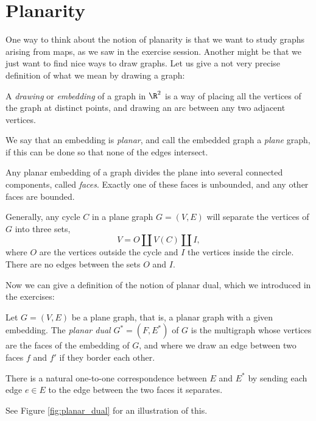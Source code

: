 \documentclass[nobib]{tufte-handout}
\begin{document}
\section{Planarity}

One way to think about the notion of planarity is that we want to study graphs arising from maps, as we saw in the exercise session. Another might be that we just want to find nice ways to draw graphs. Let us give a not very precise definition of what we mean by drawing a graph:

\begin{definition}
  A \emph{drawing} or \emph{embedding} of a graph in $\R^2$ is a way of placing all the vertices of the graph at distinct points, and drawing an arc between any two adjacent vertices.

  We say that an embedding is \emph{planar}, and call the embedded graph a \emph{plane} graph, if this can be done so that none of the edges intersect.
\end{definition}

\begin{definition}
  Any planar embedding of a graph divides the plane into several connected components, called \emph{faces}. Exactly one of these faces is unbounded, and any other faces are bounded.

  Generally, any cycle $C$ in a plane graph $G = (V,E)$ will separate the vertices of $G$ into three sets,
  $$V = O \amalg V(C) \amalg I,$$
  where $O$ are the vertices outside the cycle and $I$ the vertices inside the circle. There are no edges between the sets $O$ and $I$.
\end{definition}

Now we can give a definition of the notion of planar dual, which we introduced in the exercises:

\begin{definition}
  Let $G = (V,E)$ be a plane graph, that is, a planar graph with a given embedding. The \emph{planar dual} $G^* = (F, E^*)$ of $G$ is the multigraph whose vertices are the faces of the embedding of $G$, and where we draw an edge between two faces $f$ and $f'$ if they border each other.

  There is a natural one-to-one correspondence between $E$ and $E^*$ by sending each edge $e\in E$ to the edge between the two faces it separates.

  See Figure \ref{fig:planar_dual} for an illustration of this.
\end{definition}
\end{document}
